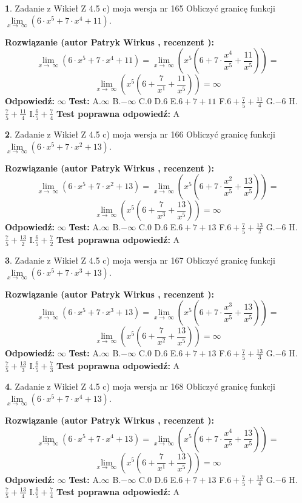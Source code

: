 \documentclass[12pt, a4paper]{article}
\theoremstyle{definition} %
\newtheorem{zad}{}
\newcommand{\zadStart}[1]{\begin{zad}#1\newline}
\newcommand{\zadStop}{\end{zad}}
\newcommand{\rozwStart}[2]{\noindent \textbf{Rozwiązanie (autor #1 , recenzent #2): }\newline}
\newcommand{\rozwStop}{\newline}
\newcommand{\odpStart}{\noindent \textbf{Odpowiedź:}\newline}
\newcommand{\odpStop}{\newline}
\newcommand{\testStart}{\noindent \textbf{Test:}\newline}
\newcommand{\testStop}{\newline}
\newcommand{\kluczStart}{\noindent \textbf{Test poprawna odpowiedź:}\newline}
\newcommand{\kluczStop}{\newline}
\begin{document}
\zadStart{Zadanie z Wikieł Z 4.5 c) moja wersja nr 165}
Obliczyć granicę funkcji  $\lim\limits_{x\to\ \infty}(6 \cdot x^{5}+7 \cdot x^{4}+11)$.
\zadStop
\rozwStart{Patryk Wirkus}{}
$$\lim\limits_{x\to\ \infty}(6 \cdot x^{5}+7 \cdot x^{4}+11) = \lim\limits_{x\to\ \infty}(x^{5}(6 +7 \cdot \frac{x^{4}}{x^{5}}+\frac{11}{x^{5}})) =$$ $$\lim\limits_{x\to\ \infty}(x^{5}(6 +\frac{7}{x^{1}}+\frac{11}{x^{5}})) =\infty$$
\rozwStop
\odpStart
$\infty$
\odpStop
\testStart
A.$\infty$ B.$-\infty$ C.$0$ D.$6$ E.$6 + 7 + 11$
F.$6+\frac{7}{5}+\frac{11}{4}$ G.$-6$
H.$\frac{7}{5}+\frac{11}{4}$
I.$\frac{6}{5}+\frac{7}{4}$
\testStop
\kluczStart
A
\kluczStop



\zadStart{Zadanie z Wikieł Z 4.5 c) moja wersja nr 166}
Obliczyć granicę funkcji  $\lim\limits_{x\to\ \infty}(6 \cdot x^{5}+7 \cdot x^{2}+13)$.
\zadStop
\rozwStart{Patryk Wirkus}{}
$$\lim\limits_{x\to\ \infty}(6 \cdot x^{5}+7 \cdot x^{2}+13) = \lim\limits_{x\to\ \infty}(x^{5}(6 +7 \cdot \frac{x^{2}}{x^{5}}+\frac{13}{x^{5}})) =$$ $$\lim\limits_{x\to\ \infty}(x^{5}(6 +\frac{7}{x^{3}}+\frac{13}{x^{5}})) =\infty$$
\rozwStop
\odpStart
$\infty$
\odpStop
\testStart
A.$\infty$ B.$-\infty$ C.$0$ D.$6$ E.$6 + 7 + 13$
F.$6+\frac{7}{5}+\frac{13}{2}$ G.$-6$
H.$\frac{7}{5}+\frac{13}{2}$
I.$\frac{6}{5}+\frac{7}{2}$
\testStop
\kluczStart
A
\kluczStop



\zadStart{Zadanie z Wikieł Z 4.5 c) moja wersja nr 167}
Obliczyć granicę funkcji  $\lim\limits_{x\to\ \infty}(6 \cdot x^{5}+7 \cdot x^{3}+13)$.
\zadStop
\rozwStart{Patryk Wirkus}{}
$$\lim\limits_{x\to\ \infty}(6 \cdot x^{5}+7 \cdot x^{3}+13) = \lim\limits_{x\to\ \infty}(x^{5}(6 +7 \cdot \frac{x^{3}}{x^{5}}+\frac{13}{x^{5}})) =$$ $$\lim\limits_{x\to\ \infty}(x^{5}(6 +\frac{7}{x^{2}}+\frac{13}{x^{5}})) =\infty$$
\rozwStop
\odpStart
$\infty$
\odpStop
\testStart
A.$\infty$ B.$-\infty$ C.$0$ D.$6$ E.$6 + 7 + 13$
F.$6+\frac{7}{5}+\frac{13}{3}$ G.$-6$
H.$\frac{7}{5}+\frac{13}{3}$
I.$\frac{6}{5}+\frac{7}{3}$
\testStop
\kluczStart
A
\kluczStop



\zadStart{Zadanie z Wikieł Z 4.5 c) moja wersja nr 168}
Obliczyć granicę funkcji  $\lim\limits_{x\to\ \infty}(6 \cdot x^{5}+7 \cdot x^{4}+13)$.
\zadStop
\rozwStart{Patryk Wirkus}{}
$$\lim\limits_{x\to\ \infty}(6 \cdot x^{5}+7 \cdot x^{4}+13) = \lim\limits_{x\to\ \infty}(x^{5}(6 +7 \cdot \frac{x^{4}}{x^{5}}+\frac{13}{x^{5}})) =$$ $$\lim\limits_{x\to\ \infty}(x^{5}(6 +\frac{7}{x^{1}}+\frac{13}{x^{5}})) =\infty$$
\rozwStop
\odpStart
$\infty$
\odpStop
\testStart
A.$\infty$ B.$-\infty$ C.$0$ D.$6$ E.$6 + 7 + 13$
F.$6+\frac{7}{5}+\frac{13}{4}$ G.$-6$
H.$\frac{7}{5}+\frac{13}{4}$
I.$\frac{6}{5}+\frac{7}{4}$
\testStop
\kluczStart
A
\kluczStop
\end{document}
